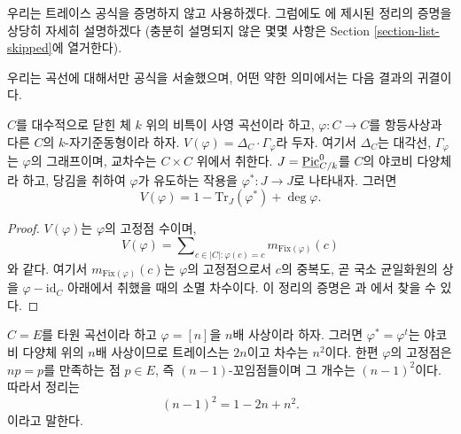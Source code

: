 \noindent
우리는 트레이스 공식을 증명하지 않고 사용하겠다. 그럼에도
\cite{SGA4.5}에 제시된 정리의 증명을 상당히 자세히 설명하겠다
(충분히 설명되지 않은 몇몇 사항은 Section
\ref{section-list-skipped}에 열거한다).

\medskip\noindent
우리는 곡선에 대해서만 공식을 서술했으며, 어떤 약한 의미에서는
다음 결과의 귀결이다.

\begin{theorem}[Weil]
\label{theorem-weil-trace-formula}
$C$를 대수적으로 닫힌 체 $k$ 위의 비특이 사영 곡선이라 하고,
$\varphi : C \to C$를 항등사상과 다른 $C$의 $k$-자기준동형이라 하자.
$V(\varphi) = \Delta_C \cdot \Gamma_\varphi$라 두자. 여기서
$\Delta_C$는 대각선, $\Gamma_\varphi$는 $\varphi$의 그래프이며,
교차수는 $C \times C$ 위에서 취한다.
$J = \underline{\mathrm{Pic}}^0_{C/k}$를 $C$의 야코비 다양체라 하고,
당김을 취하여 $\varphi$가 유도하는 작용을
$\varphi^* : J \to J$로 나타내자. 그러면
$$
V(\varphi) = 1 - \text{Tr}_J(\varphi^*) + \deg \varphi.
$$
\end{theorem}

\begin{proof}
$V(\varphi)$는 $\varphi$의 고정점 수이며,
$$
V(\varphi) =
\sum\nolimits_{c \in |C| : \varphi(c) = c} m_{\text{Fix}(\varphi)} (c)
$$
와 같다. 여기서 $m_{\text{Fix}(\varphi)} (c)$는 $\varphi$의
고정점으로서 $c$의 중복도, 곧 국소 균일화원의 상을
$\varphi - \text{id}_C$ 아래에서 취했을 때의 소멸 차수이다.
이 정리의 증명은 \cite{Lang}과 \cite{Weil}에서 찾을 수 있다.
\end{proof}

\begin{example}
\label{example-elliptic-curve}
$C = E$를 타원 곡선이라 하고 $\varphi = [n]$을 $n$배 사상이라 하자.
그러면 $\varphi^* = \varphi^t$는 야코비 다양체 위의 $n$배 사상이므로
트레이스는 $2n$이고 차수는 $n^2$이다. 한편 $\varphi$의 고정점은
$n p = p$를 만족하는 점 $p \in E$, 즉 $(n-1)$-꼬임점들이며 그
개수는 $(n-1)^2$이다. 따라서 정리는
$$
(n-1)^2 = 1 - 2n + n^2.
$$
이라고 말한다.
\end{example}

